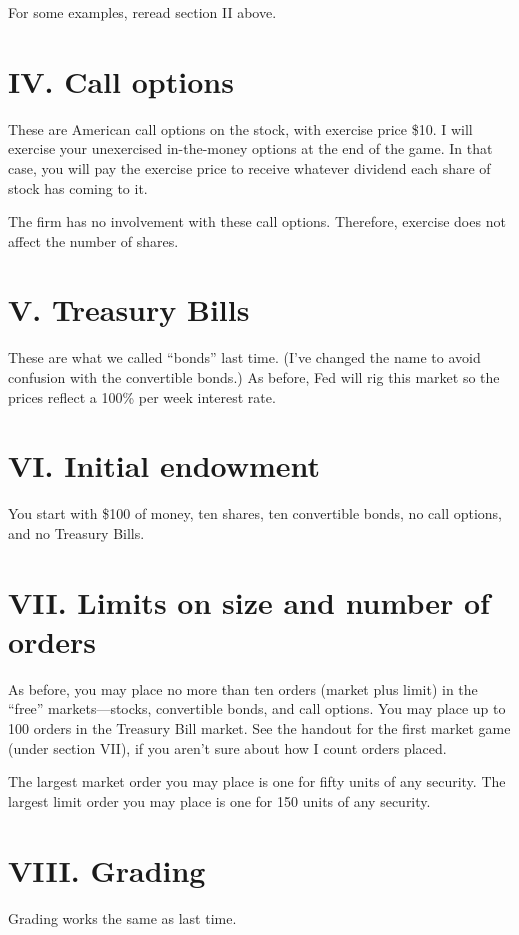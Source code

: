 For some examples, reread section II above.

\section{IV. Call options}%
These are American call options on the stock, with exercise price
\$10.  I will exercise your unexercised in-the-money options at the
end of the game.  In that case, you will pay the exercise price to
receive whatever dividend each share of stock has coming to it.

The firm has no involvement with these call options.  Therefore,
exercise does not affect the number of shares.

\section{V. Treasury Bills}%
These are what we called ``bonds'' last time.  (I've changed the name
to avoid confusion with the convertible bonds.)  As before, Fed will
rig this market so the prices reflect a 100\% per week interest rate.


\section{VI. Initial endowment} %
You start with \$100 of money, ten shares, ten convertible bonds,
no call options, and no Treasury Bills.

\section{VII. Limits on size and number of orders}%
As before, you may place no more than ten orders (market plus limit)
in the ``free'' markets---stocks, convertible bonds, and call
options.  You may place up to 100 orders in the Treasury Bill market.
See the handout for the first market game (under section VII), if you
aren't sure about how I count orders placed.

The largest market order you may place is one for fifty units of any
security.  The largest limit order you may place is one for 150 units
of any security.  

\section{VIII. Grading}%
Grading works the same as last time.%

